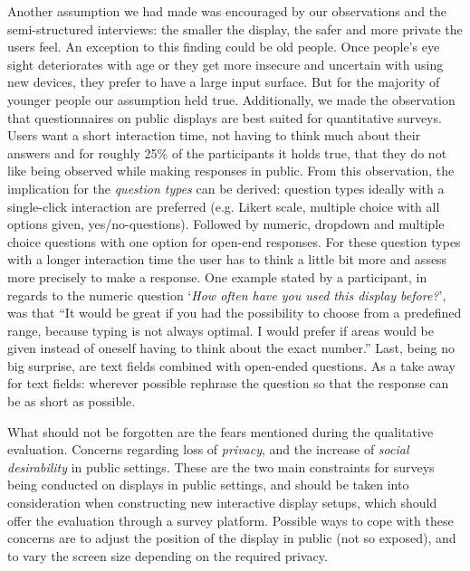 	Another assumption we had made was encouraged by our observations and the semi-structured interviews: the smaller the display, the safer and more private the users feel. An exception to this finding could be old people. Once people's eye sight deteriorates with age or they get more insecure and uncertain with using new devices, they prefer to have a large input surface. But for the majority of younger people our assumption held true.
	Additionally, we made the observation that questionnaires on public displays are best suited for quantitative surveys. Users want a short interaction time, not having to think much about their answers and for roughly 25\% of the participants it holds true, that they do not like being observed while making responses in public.
	From this observation, the implication for the \textit{question types} can be derived: question types ideally with a single-click interaction are preferred (e.g. Likert scale, multiple choice with all options given, yes/no-questions). Followed by numeric, dropdown and multiple choice questions with one option for open-end responses. For these question types with a longer interaction time the user has to think a little bit more and assess more precisely to make a response. One example stated by a participant, in regards to the numeric question `\textit{How often have you used this display before?}', was that ``It would be great if you had the possibility to choose from a predefined range, because typing is not always optimal. I would prefer if areas would be given instead of oneself having to think about the exact number.'' Last, being no big surprise, are text fields combined with open-ended questions. As a take away for text fields: wherever possible rephrase the question so that the response can be as short as possible.


	What should not be forgotten are the fears mentioned during the qualitative evaluation. Concerns regarding loss of \textit{privacy}, and the increase of \textit{social desirability} in public settings. These are the two main constraints for surveys being conducted on displays in public settings, and should be taken into consideration when constructing new interactive display setups, which should offer the evaluation through a survey platform. Possible ways to cope with these concerns are to adjust the position of the display in public (not so exposed), and to vary the screen size depending on the required privacy.

